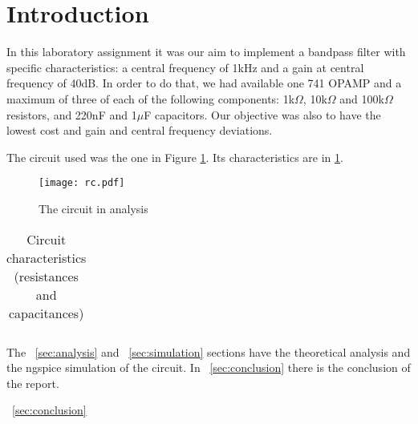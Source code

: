 \section{Introduction}
\label {sec:introduction}


In this laboratory assignment it was our aim to implement a bandpass filter with specific characteristics: a central frequency of 1kHz and a gain at central frequency of 40dB. In order to do that, we had available one 741 OPAMP and a maximum of three of each of the following components: 1k$\Omega$, 10k$\Omega$ and 100k$\Omega$ resistors, and 220nF and 1$\mu$F capacitors. Our objective was also to have the lowest cost and gain and central frequency deviations.

The circuit used was the one in Figure \ref{fig:circuit}. Its characteristics are in \ref{tab:circuit}.


\begin{figure}[H] \centering
\texttt{[image: rc.pdf]}
\caption{The circuit in analysis}
\label{fig:circuit}
\end{figure}


\begin{table}[H]
  \centering
  \begin{tabular}{|c|c|}
    \hline
      
  \end{tabular}
  \caption{Circuit characteristics (resistances and capacitances)}
  \label{tab:circuit}
\end{table}



%      

The ~\ref{sec:analysis} and ~\ref{sec:simulation} sections have the theoretical analysis and the ngspice simulation of the circuit. In ~\ref{sec:conclusion} there is the conclusion of the report.


~\ref{sec:conclusion}
